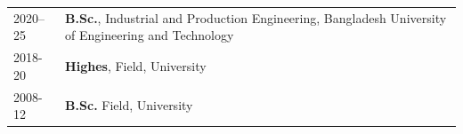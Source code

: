 

\renewcommand{\thefootnote}{\fnsymbol{footnote}}
\setcounter{footnote}{0}

\begin{longtable}[l]{@{}p{} p{}}
    2020--25\footnotemark & \textbf{B.Sc.}, Industrial and Production Engineering, Bangladesh University of Engineering and Technology \\

    2018-20 & \textbf{Highes}, Field, University \\

    2008-12 & \textbf{B.Sc.} Field, University
\end{longtable}



\renewcommand{\thefootnote}{\arabic{footnote}}
\setcounter{footnote}{1}

